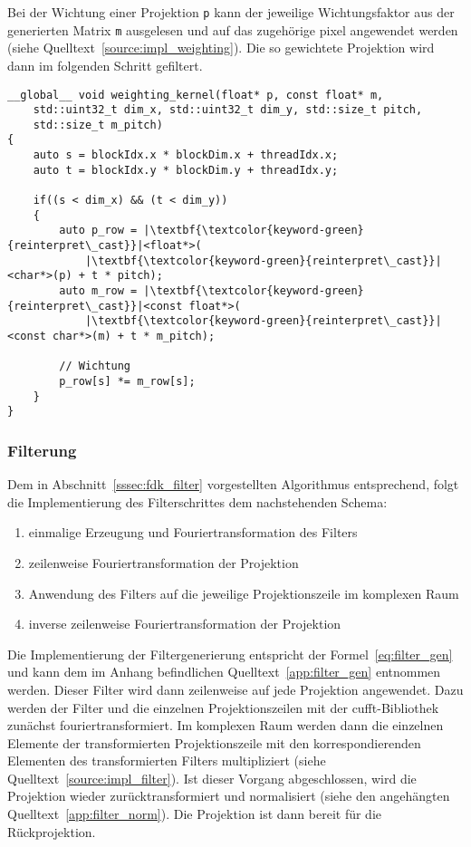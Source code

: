 Bei der Wichtung einer Projektion \texttt{p} kann der jeweilige Wichtungsfaktor aus der generierten Matrix \texttt{m}
ausgelesen und auf das zugehörige \gls{pixel} angewendet werden (siehe Quelltext~\ref{source:impl_weighting}). Die so
gewichtete Projektion wird dann im folgenden Schritt gefiltert.

\begin{code}
\begin{verbatim}
__global__ void weighting_kernel(float* p, const float* m,
    std::uint32_t dim_x, std::uint32_t dim_y, std::size_t pitch,
    std::size_t m_pitch)
{
    auto s = blockIdx.x * blockDim.x + threadIdx.x;
    auto t = blockIdx.y * blockDim.y + threadIdx.y;

    if((s < dim_x) && (t < dim_y))
    {
        auto p_row = |\textbf{\textcolor{keyword-green}{reinterpret\_cast}}|<float*>(
            |\textbf{\textcolor{keyword-green}{reinterpret\_cast}}|<char*>(p) + t * pitch);
        auto m_row = |\textbf{\textcolor{keyword-green}{reinterpret\_cast}}|<const float*>(
            |\textbf{\textcolor{keyword-green}{reinterpret\_cast}}|<const char*>(m) + t * m_pitch);

        // Wichtung
        p_row[s] *= m_row[s];
    }
}
\end{verbatim}
\label{source:impl_weighting}
\end{code}

\subsubsection{Filterung}

Dem in Abschnitt~\ref{sssec:fdk_filter} vorgestellten Algorithmus entsprechend, folgt die Implementierung des
Filterschrittes dem nachstehenden Schema:

\begin{enumerate}
    \item einmalige Erzeugung und Fouriertransformation des Filters
    \item zeilenweise Fouriertransformation der Projektion
    \item Anwendung des Filters auf die jeweilige Projektionszeile im komplexen Raum
    \item inverse zeilenweise Fouriertransformation der Projektion
\end{enumerate}

Die Implementierung der Filtergenerierung entspricht der Formel~\ref{eq:filter_gen} und kann dem im Anhang befindlichen
Quelltext~\ref{app:filter_gen} entnommen werden. Dieser Filter wird dann zeilenweise auf jede Projektion angewendet.
Dazu werden der Filter und die einzelnen Projektionszeilen mit der \gls{cufft}-Bibliothek zunächst fouriertransformiert.
Im komplexen Raum werden dann die einzelnen Elemente der transformierten Projektionszeile mit den korrespondierenden
Elementen des transformierten Filters multipliziert (siehe Quelltext~\ref{source:impl_filter}). Ist dieser Vorgang
abgeschlossen, wird die Projektion wieder zurücktransformiert und normalisiert (siehe den angehängten
Quelltext~\ref{app:filter_norm}). Die Projektion ist dann bereit für die Rückprojektion.

